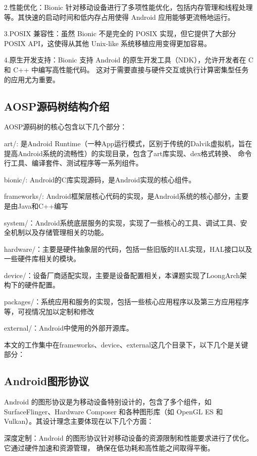 2.性能优化：Bionic 针对移动设备进行了多项性能优化，包括内存管理和线程处理等。其快速的启动时间和低内存占用使得 
Android 应用能够更流畅地运行。

3.POSIX 兼容性：虽然 Bionic 不是完全的 POSIX 实现，但它提供了大部分 POSIX API，这使得从其他 Unix-like 
系统移植应用变得更加容易。

4.原生开发支持：Bionic 支持 Android 的原生开发工具（NDK），允许开发者在 C 和 C++ 中编写高性能代码。
这对于需要直接与硬件交互或执行计算密集型任务的应用尤为重要。

\subsection{AOSP源码树结构介绍}
AOSP源码树的核心包含以下几个部分：

  art/: 是Android Runtime（一种App运行模式，区别于传统的Dalvik虚拟机，旨在提高Android系统的流畅性）的实现目录，包含了art库实现、dex格式转换、
  命令行工具、编译套件、测试程序等一系列组件。

  bionic/: Android的C库实现源码，是Android实现的核心组件。

  frameworks/: Android框架层核心代码的实现，是Android系统的核心部分，主要是由Java和C++编写

  system/：Android系统底层服务的实现，实现了一些核心的工具、调试工具、安全机制以及存储管理相关的功能。

  hardware/：主要是硬件抽象层的代码，包括一些旧版的HAL实现，HAL接口以及一些硬件库相关的模块。

  device/：设备厂商适配实现，主要是设备配置相关，本课题实现了LoongArch架构下的硬件配置。

  packages/：系统应用和服务的实现，包括一些核心应用程序以及第三方应用程序等，可视情况加以定制和修改

  external/：Android中使用的外部开源库。

  本文的工作集中在frameworks、device、external这几个目录下，以下几个是关键部分：

  

\subsection{Android图形协议}
Android 的图形协议是为移动设备特别设计的，包含了多个组件，如 SurfaceFlinger、Hardware Composer 
和各种图形库（如 OpenGL ES 和 Vulkan）。其设计理念主要体现在以下几个方面：

深度定制：Android 的图形协议针对移动设备的资源限制和性能要求进行了优化。它通过硬件加速和资源管理，
确保在低功耗和高性能之间取得平衡。

